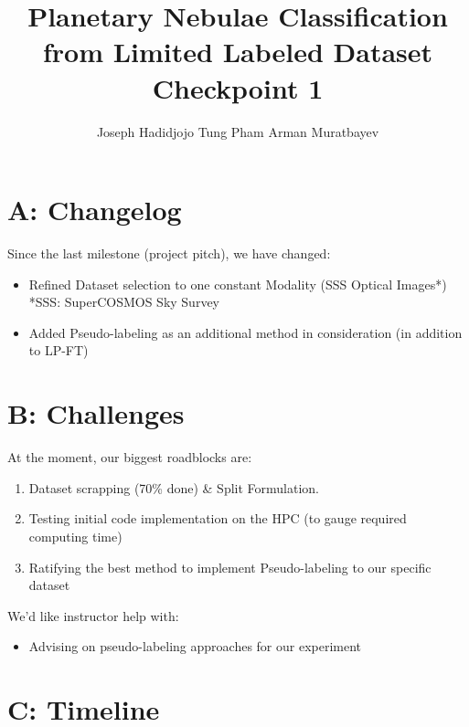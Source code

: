 \documentclass{article}
\title{Planetary Nebulae Classification from Limited Labeled Dataset \\ Checkpoint 1}
\author{Joseph Hadidjojo \And Tung Pham \And Arman Muratbayev}
\begin{document}
\maketitle



\section*{A: Changelog}

Since the last milestone (project pitch), we have changed:
\begin{itemize}
    \item Refined Dataset selection to one constant Modality (SSS Optical Images*) \\ *SSS: SuperCOSMOS Sky Survey
    \item Added Pseudo-labeling as an additional method in consideration (in addition to LP-FT)
\end{itemize}

\section*{B: Challenges}
At the moment, our biggest roadblocks are:
\begin{enumerate}
    \item Dataset scrapping (70\% done) \& Split Formulation.
    \item Testing initial code implementation on the HPC (to gauge required computing time)
    \item Ratifying the best method to implement Pseudo-labeling to our specific dataset
\end{enumerate}

We'd like instructor help with:
\begin{itemize}
    \item Advising on pseudo-labeling approaches for our experiment
\end{itemize}

\section*{C: Timeline}
\end{document}
